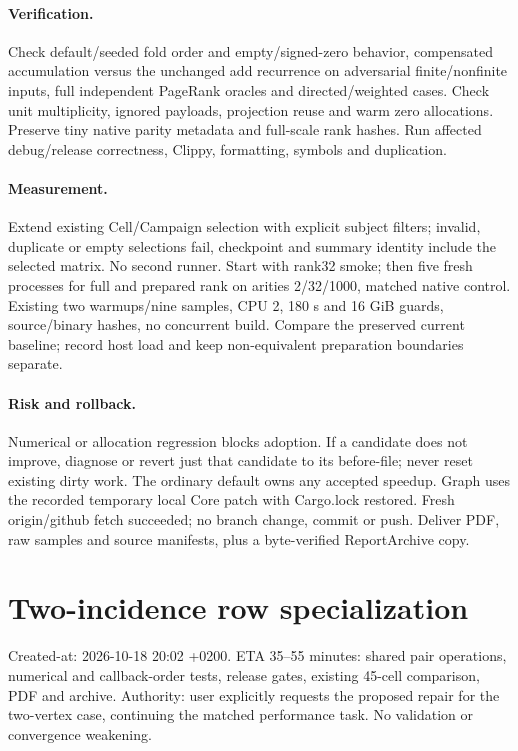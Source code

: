 \documentclass[11pt,a4paper]{article}
\begin{document}
\paragraph{Verification.} Check default/seeded fold order and empty/signed-zero
behavior, compensated accumulation versus the unchanged add recurrence on adversarial
finite/nonfinite inputs, full independent PageRank oracles and directed/weighted
cases. Check unit multiplicity, ignored payloads, projection reuse and warm zero
allocations. Preserve tiny native parity metadata and full-scale rank hashes.
Run affected debug/release correctness, Clippy, formatting, symbols and duplication.
\paragraph{Measurement.} Extend existing Cell/Campaign selection with explicit
subject filters; invalid, duplicate or empty selections fail, checkpoint and summary
identity include the selected matrix. No second runner. Start with rank32 smoke;
then five fresh processes for full and prepared rank on arities 2/32/1000, matched
native control. Existing two warmups/nine samples, CPU 2, 180 s and 16 GiB guards,
source/binary hashes, no concurrent build. Compare the preserved current baseline;
record host load and keep non-equivalent preparation boundaries separate.
\paragraph{Risk and rollback.} Numerical or allocation regression blocks adoption.
If a candidate does not improve, diagnose or revert just that candidate to its
before-file; never reset existing dirty work. The ordinary default owns any accepted
speedup. Graph uses the recorded temporary local Core patch with Cargo.lock restored.
Fresh origin/github fetch succeeded; no branch change, commit or push. Deliver PDF,
raw samples and source manifests, plus a byte-verified ReportArchive copy.


\newpage\section*{Two-incidence row specialization}
Created-at: 2026-10-18 20:02 +0200. ETA 35--55 minutes: shared pair operations, numerical and
callback-order tests, release gates, existing 45-cell comparison, PDF and archive.
Authority: user explicitly requests the proposed repair for the two-vertex case,
continuing the matched performance task. No validation or convergence weakening.
\end{document}
